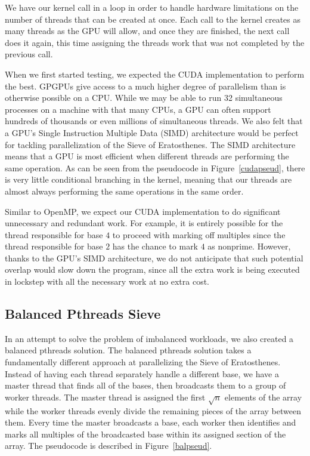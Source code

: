 \documentclass[11pt,twocolumn]{article}
\begin{document}
We have our kernel call in a loop in order to handle hardware limitations
on the number of threads that can be created at once. Each call to
the kernel creates as many threads as the GPU will allow, and once
they are finished, the next call does it again, this time assigning
the threads work that was not completed by the previous call.

When we first started testing, we expected the CUDA implementation
to perform the best. GPGPUs give access to a much higher degree
of parallelism than is otherwise possible on a CPU. While we may
be able to run 32 simultaneous processes on a machine with that
many CPUs, a GPU can often support hundreds of thousands or even millions
of simultaneous threads. We also felt that a GPU's Single Instruction
Multiple Data (SIMD) architecture would be perfect for tackling parallelization
of the Sieve of Eratosthenes. The SIMD architecture means that a GPU is 
most efficient when different threads are performing the same operation. 
As can be seen from the pseudocode in Figure~\ref{cudapseud}, there
is very little conditional branching in the kernel, meaning that our 
threads are almost always performing the same operations in the same order.

Similar to OpenMP, we expect our CUDA implementation to do significant
unnecessary and redundant work. For example, it is entirely possible
for the thread responsible for base $4$ to proceed with marking off
multiples since the thread responsible for base $2$ has the chance to
mark $4$ as nonprime. However, thanks to the GPU's SIMD architecture,
we do not anticipate that such potential overlap would slow down the 
program, since all the extra work is being executed in lockstep with 
all the necessary work at no extra cost.

\subsection{Balanced Pthreads Sieve}\label{balsection}

In an attempt to solve the problem of imbalanced workloads, we also created
a balanced pthreads solution. The balanced pthreads solution takes a 
fundamentally different approach at parallelizing the Sieve of Eratosthenes. 
Instead of having each thread separately handle a different base, 
we have a master thread that finds all of the bases, then broadcasts 
them to a group of worker threads. The master thread is assigned the 
first $\sqrt{n}$ elements of the array while the worker threads evenly divide 
the remaining pieces of the array between them. Every time the master 
broadcasts a base, each worker then identifies and marks all multiples of
the broadcasted base within its assigned section of the array. The
pseudocode is described in Figure~\ref{balpseud}.
\end{document}

